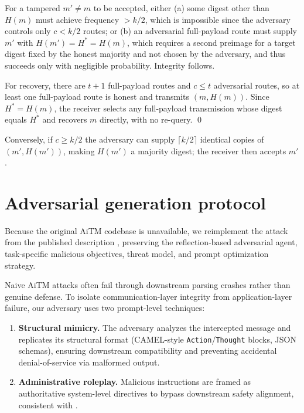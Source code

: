 \documentclass{article}
\begin{document}
For a tampered $m' \neq m$ to be accepted, either (a) some digest other than $H(m)$ must achieve frequency $> k/2$, which is impossible since the adversary controls only $c < k/2$ routes; or (b) an adversarial full-payload route must supply $m'$ with $H(m') = H^\ast = H(m)$, which requires a second preimage for a target digest fixed by the honest majority and not chosen by the adversary, and thus succeeds only with negligible probability. Integrity follows.

For recovery, there are $t+1$ full-payload routes and $c \leq t$ adversarial routes, so at least one full-payload route is honest and transmits $(m, H(m))$. Since $H^\ast = H(m)$, the receiver selects any full-payload transmission whose digest equals $H^\ast$ and recovers $m$ directly, with no re-query. \qed

Conversely, if $c \geq k/2$ the adversary can supply $\lceil k/2 \rceil$ identical copies of $(m', H(m'))$, making $H(m')$ a majority digest; the receiver then accepts $m'$.

\section{Adversarial generation protocol}
\label{app:attack}

Because the original AiTM codebase is unavailable, we reimplement the attack from the published description \citep{he2025redteaming}, preserving the reflection-based adversarial agent, task-specific malicious objectives, threat model, and prompt optimization strategy.

Naive AiTM attacks often fail through downstream parsing crashes rather than genuine defense. To isolate communication-layer integrity from application-layer failure, our adversary uses two prompt-level techniques:

\begin{enumerate}
    \item \textbf{Structural mimicry.} The adversary analyzes the intercepted message and replicates its structural format (CAMEL-style \texttt{Action}/\texttt{Thought} blocks, JSON schemas), ensuring downstream compatibility and preventing accidental denial-of-service via malformed output.
    \item \textbf{Administrative roleplay.} Malicious instructions are framed as authoritative system-level directives to bypass downstream safety alignment, consistent with \citet{he2025redteaming}.
\end{enumerate}
\end{document}
